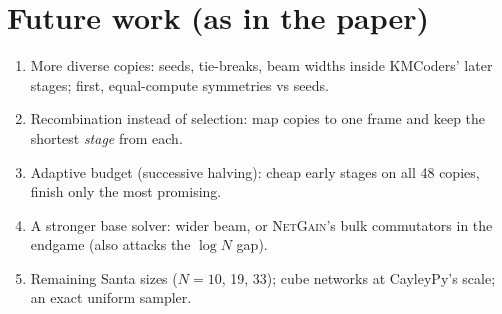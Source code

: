 \documentclass[10.5pt,a4paper]{article}
\newcommand{\M}[1]{\textsc{#1}}
\begin{document}
\section{Future work (as in the paper)}
\begin{enumerate}
\item More diverse copies: seeds, tie-breaks, beam widths inside KMCoders' later stages; first, equal-compute symmetries vs seeds.
\item Recombination instead of selection: map copies to one frame and keep the shortest \emph{stage} from each.
\item Adaptive budget (successive halving): cheap early stages on all 48 copies, finish only the most promising.
\item A stronger base solver: wider beam, or \M{NetGain}'s bulk commutators in the endgame (also attacks the $\log N$ gap).
\item Remaining Santa sizes ($N=10$, 19, 33); cube networks at CayleyPy's scale; an exact uniform sampler.
\end{enumerate}
\end{document}
